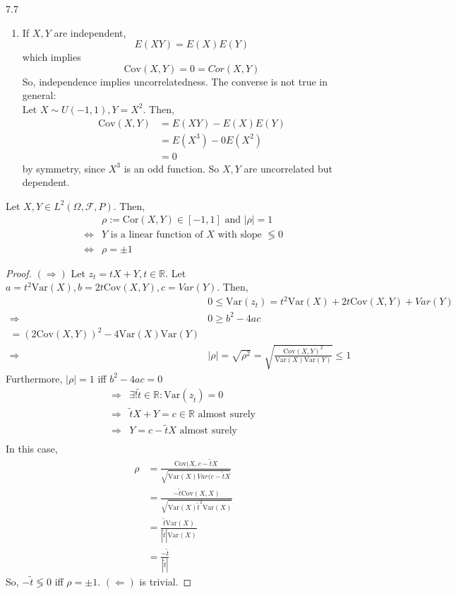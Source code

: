 \documentclass{article}
\newcommand{\R}{\mathbb{R}}
\newcommand{\Var}{\mathrm{Var}}
\newcommand{\Cov}{\mathrm{Cov}}
\newcommand{\Cor}{\text{Cor}}
\begin{document}
\begin{myrem}{}{7.7}
\begin{enumerate}
				\item If $X, Y$ are independent, $$E(XY)=E(X)E(Y)$$ which implies $$\Cov(X, Y)=0=Cor(X, Y)$$
				So, independence implies uncorrelatedness. The converse is not true in general:\\
				
				Let $X\sim U(-1, 1), Y=X^2$. Then,\
				\begin{align*}
					\Cov(X, Y)&=E(XY)-E(X)E(Y)\\
					&=E(X^3)-0E(X^2)\\
					&=0
				\end{align*}
				by symmetry, since $X^3$ is an odd function. So $X, Y$ are uncorrelated but dependent.
			\end{enumerate}
		\end{myrem}
		
		\begin{myprop}{}{}
			Let $X, Y\in L^2(\Omega, \mathcal{F}, P)$. Then,
			\begin{align*}
				&\rho:=\Cor(X, Y)\in[-1, 1]\mbox{ and }|\rho|=1\\
				\Leftrightarrow&Y\mbox{ is a linear function of $X$ with slope }\lessgtr0\\
				\Leftrightarrow&\rho=\pm1
			\end{align*}
			
			\begin{proof}
				$(\Rightarrow)$ Let $z_t=tX+Y, t\in\R$. Let $a=t^2\Var(X), b=2t\Cov(X, Y), c=Var(Y)$. Then,
				\begin{align*}
					&0\leq\Var(z_t)=t^2\Var(X)+2t\Cov(X, Y)+Var(Y)\\
					\Rightarrow&0\geq b^2-4ac\\=(2\Cov(X, Y))^2-4\Var(X)\Var(Y)\\
					\Rightarrow&|\rho|=\sqrt{\rho^2}=\sqrt{\frac{\Cov(X, Y)^2}{\Var(X)\Var(Y)}}\leq1
				\end{align*}
				Furthermore, $|\rho|=1$ iff $b^2-4ac=0$
				\begin{align*}
					\Rightarrow&\exists!\tilde{t}\in\R: \Var(z_{\tilde{t}})=0\\
					\Rightarrow&\tilde{t}X+Y=c\in\R\mbox{ almost surely}\\
					\Rightarrow&Y=c-\tilde{t}X\mbox{ almost surely}\\
				\end{align*}
				In this case,
				\begin{align*}
					\rho&=\frac{\Cov(X, c-\tilde{t}X}{\sqrt{\Var(X)Var(c-\tilde{t}X}}\\
					&=\frac{-\tilde{t}\Cov(X, X)}{\sqrt{\Var(X)\tilde{t}^2\Var(X)}}\\
					&=\frac{\tilde{t}\Var(X)}{|\tilde{t}|\Var(X)}\\
					&=\frac{-\tilde{t}}{|\tilde{t}|}
				\end{align*}
				So, $-\tilde{t}\lessgtr0$ iff $\rho=\pm1$. $(\Leftarrow)$ is trivial.
			\end{proof}
		\end{myprop}
		
\end{document}
